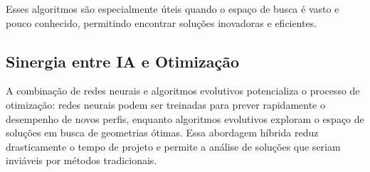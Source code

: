 Esses algoritmos são especialmente úteis quando o espaço de busca é vasto e pouco conhecido, permitindo encontrar soluções inovadoras e eficientes.

\subsection{Sinergia entre IA e Otimização}
A combinação de redes neurais e algoritmos evolutivos potencializa o processo de otimização: redes neurais podem ser treinadas para prever rapidamente o desempenho de novos perfis, enquanto algoritmos evolutivos exploram o espaço de soluções em busca de geometrias ótimas. Essa abordagem híbrida reduz drasticamente o tempo de projeto e permite a análise de soluções que seriam inviáveis por métodos tradicionais.
